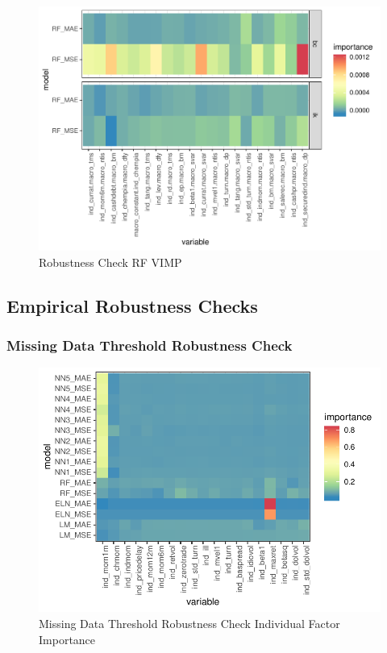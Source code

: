 \documentclass[11pt, a4paper, table]{article}
\begin{document}
\begin{figure}
	\includegraphics[]{../Results/empirical/empirical_vimp.pdf}
	\caption{Robustness Check RF VIMP}
\end{figure}

\FloatBarrier

\subsection{Empirical Robustness Checks}

\subsubsection{Missing Data Threshold Robustness Check}




\FloatBarrier


\begin{figure}
	\includegraphics[]{../Results/empirical_missing_threshold/empirical_all_sample_vi_ind.pdf}
	\caption{Missing Data Threshold Robustness Check Individual Factor Importance}
\end{figure}
\end{document}
